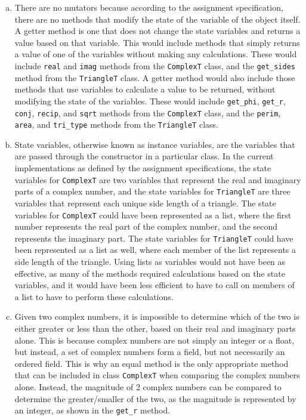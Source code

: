 \documentclass[12pt]{article}
\begin{document}
\begin{enumerate}[(a)]

\item There are no mutators because according to the assignment specification, there are no methods that modify the state of the variable of the object itself. A getter method is one that does not change the state variables and returns a value based on that variable. This would include methods that simply returns a value of one of the variables without making any calculations. These would include \verb |real| and \verb |imag| methods from the \verb |ComplexT| class, and the \verb |get_sides| method from the \verb |TriangleT| class. A getter method would also include those methods that use variables to calculate a value to be returned, without modifying the state of the variables. These would include \verb |get_phi|, \verb |get_r|, \verb |conj|, \verb |recip|, and \verb |sqrt| methods from the \verb |ComplexT| class, and the \verb |perim|, \verb |area|, and \verb |tri_type| methods from the \verb |TriangleT| class.

\newpage 

\item State variables, otherwise known as instance variables, are the variables that are passed through the constructor in a particular class. In the current implementations as defined by the assignment specifications, the state variables for \verb |ComplexT| are two variables that represent the real and imaginary parts of a complex number, and the state variables for \verb |TriangleT| are three variables that represent each unique side length of a triangle. The state variables for \verb |ComplexT| could have been represented as a list, where the first number represents the real part of the complex number, and the second represents the imaginary part. The state variables for \verb |TriangleT| could have been represented as a list as well, where each member of the list represents a side length of the triangle. Using lists as variables would not have been as effective, as many of the methods required calculations based on the state variables, and it would have been less efficient to have to call on members of a list to have to perform these calculations. 

\item Given two complex numbers, it is impossible to determine which of the two is either greater or less than the other, based on their real and imaginary parts alone. This is because complex numbers are not simply an integer or a float, but instead, a set of complex numbers form a field, but not necessarily an ordered field. This is why an equal method is the only appropriate method that can be included in class \verb |ComplexT| when comparing the complex numbers alone. Instead, the magnitude of 2 complex numbers can be compared to determine the greater/smaller of the two, as the magnitude is represented by an integer, as shown in the \verb |get_r| method. 


\end{enumerate}
\end{document}
